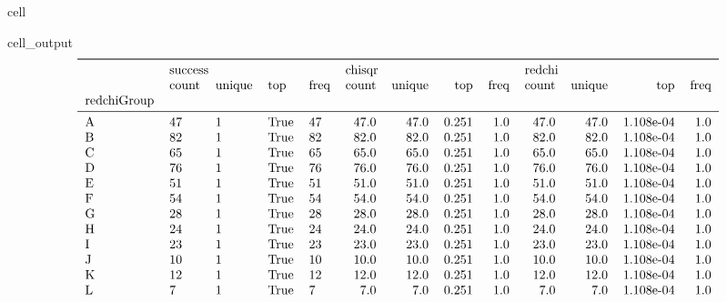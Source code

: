 \documentclass[letterpaper,table,10pt,english]{jupyterBook}
\begin{document}
\begin{sphinxuseclass}{cell}
\begin{sphinxVerbatimOutput}
\begin{sphinxuseclass}{cell_output}\begin{equation*}
\begin{split}\begin{tabular}{lllllrrrrrrrr}
\toprule
{} & \multicolumn{4}{l}{success} & \multicolumn{4}{l}{chisqr} & \multicolumn{4}{l}{redchi} \\
{} &   count & unique &   top & freq &  count & unique &    top & freq &  count & unique &        top & freq \\
redchiGroup &         &        &       &      &        &        &        &      &        &        &            &      \\
\midrule
A           &      47 &      1 &  True &   47 &   47.0 &   47.0 &  0.251 &  1.0 &   47.0 &   47.0 &  1.108e-04 &  1.0 \\
B           &      82 &      1 &  True &   82 &   82.0 &   82.0 &  0.251 &  1.0 &   82.0 &   82.0 &  1.108e-04 &  1.0 \\
C           &      65 &      1 &  True &   65 &   65.0 &   65.0 &  0.251 &  1.0 &   65.0 &   65.0 &  1.108e-04 &  1.0 \\
D           &      76 &      1 &  True &   76 &   76.0 &   76.0 &  0.251 &  1.0 &   76.0 &   76.0 &  1.108e-04 &  1.0 \\
E           &      51 &      1 &  True &   51 &   51.0 &   51.0 &  0.251 &  1.0 &   51.0 &   51.0 &  1.108e-04 &  1.0 \\
F           &      54 &      1 &  True &   54 &   54.0 &   54.0 &  0.251 &  1.0 &   54.0 &   54.0 &  1.108e-04 &  1.0 \\
G           &      28 &      1 &  True &   28 &   28.0 &   28.0 &  0.251 &  1.0 &   28.0 &   28.0 &  1.108e-04 &  1.0 \\
H           &      24 &      1 &  True &   24 &   24.0 &   24.0 &  0.251 &  1.0 &   24.0 &   24.0 &  1.108e-04 &  1.0 \\
I           &      23 &      1 &  True &   23 &   23.0 &   23.0 &  0.251 &  1.0 &   23.0 &   23.0 &  1.108e-04 &  1.0 \\
J           &      10 &      1 &  True &   10 &   10.0 &   10.0 &  0.251 &  1.0 &   10.0 &   10.0 &  1.108e-04 &  1.0 \\
K           &      12 &      1 &  True &   12 &   12.0 &   12.0 &  0.251 &  1.0 &   12.0 &   12.0 &  1.108e-04 &  1.0 \\
L           &       7 &      1 &  True &    7 &    7.0 &    7.0 &  0.251 &  1.0 &    7.0 &    7.0 &  1.108e-04 &  1.0 \\

\end{tabular}
\end{split}
\end{equation*}
\end{sphinxuseclass}
\end{sphinxVerbatimOutput}
\end{sphinxuseclass}
\end{document}

